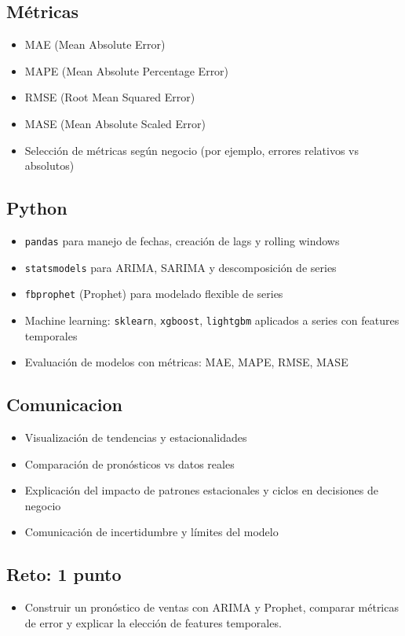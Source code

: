 \documentclass[12pt,a4paper,openany,oneside]{book}
\begin{document}
\begin{itemize}
\subsection{Métricas}
\begin{itemize}
    \item MAE (Mean Absolute Error)
    \item MAPE (Mean Absolute Percentage Error)
    \item RMSE (Root Mean Squared Error)
    \item MASE (Mean Absolute Scaled Error)
    \item Selección de métricas según negocio (por ejemplo, errores relativos vs absolutos)
\end{itemize}

\subsection{Python}
\begin{itemize}
    \item \texttt{pandas} para manejo de fechas, creación de lags y rolling windows
    \item \texttt{statsmodels} para ARIMA, SARIMA y descomposición de series
    \item \texttt{fbprophet} (Prophet) para modelado flexible de series
    \item Machine learning: \texttt{sklearn}, \texttt{xgboost}, \texttt{lightgbm} aplicados a series con features temporales
    \item Evaluación de modelos con métricas: MAE, MAPE, RMSE, MASE
\end{itemize}

\subsection{Comunicacion}
\begin{itemize}
    \item Visualización de tendencias y estacionalidades
    \item Comparación de pronósticos vs datos reales
    \item Explicación del impacto de patrones estacionales y ciclos en decisiones de negocio
    \item Comunicación de incertidumbre y límites del modelo
\end{itemize}

\subsection{Reto: 1 punto}
\begin{itemize}
    \item Construir un pronóstico de ventas con ARIMA y Prophet, comparar métricas de error y explicar la elección de features temporales.
\end{itemize}


\end{itemize}
\end{document}
